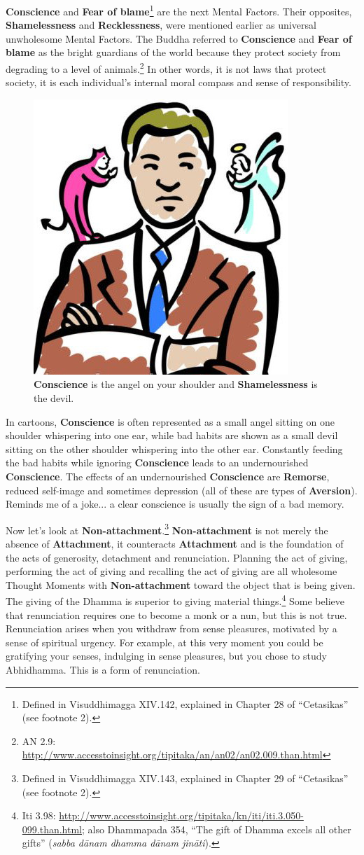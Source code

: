 \textbf{Conscience} and \textbf{Fear of blame}\footnote{Defined in Visuddhimagga XIV.142, explained in Chapter 28 of “Cetasikas” (see footnote 2).} are the next Mental Factors. Their opposites, \textbf{Shamelessness} and \textbf{Recklessness}, were mentioned earlier as universal unwholesome Mental Factors. The Buddha referred to \textbf{Conscience} and \textbf{Fear of blame} as the bright guardians of the world because they protect society from degrading to a level of animals.\footnote{AN 2.9: \url{http://www.accesstoinsight.org/tipitaka/an/an02/an02.009.than.html}} In other words, it is not laws that protect society, it is each individual’s internal moral compass and sense of responsibility.

\begin{figure}[h]
\centering
\includegraphics[width=0.17\linewidth]{./Diagrams/AngelDevil}
\caption{\textbf{Conscience} is the angel on your shoulder and \textbf{Shamelessness} is the devil.}
\label{fig:AngelDevil}
\end{figure}

In cartoons, \textbf{Conscience} is often represented as a small angel sitting on one shoulder whispering into one ear, while bad habits are shown as a small devil sitting on the other shoulder whispering into the other ear. Constantly feeding the bad habits while ignoring \textbf{Conscience} leads to an undernourished \textbf{Conscience}. The effects of an undernourished \textbf{Conscience} are \textbf{Remorse}, reduced self-image and sometimes depression (all of these are types of \textbf{Aversion}). Reminds me of a joke... a clear conscience is usually the sign of a bad memory.

Now let’s look at \textbf{Non-attachment}.\footnote{Defined in Visuddhimagga XIV.143, explained in Chapter 29 of “Cetasikas” (see footnote 2).} \textbf{Non-attachment} is not merely the absence of \textbf{Attachment}, it counteracts \textbf{Attachment} and is the foundation of the acts of generosity, detachment and renunciation. Planning the act of giving, performing the act of giving and recalling the act of giving are all wholesome Thought Moments with \textbf{Non-attachment} toward the object that is being given. The giving of the Dhamma is superior to giving material things.\footnote{Iti 3.98: \url{http://www.accesstoinsight.org/tipitaka/kn/iti/iti.3.050-099.than.html}; also Dhammapada 354, “The gift of Dhamma excels all other gifts” (\textit{sabba dānam dhamma dānam jināti}).} Some believe that renunciation requires one to become a monk or a nun, but this is not true. Renunciation arises when you withdraw from sense pleasures, motivated by a sense of spiritual urgency. For example, at this very moment you could be gratifying your senses, indulging in sense pleasures, but you chose to study Abhidhamma. This is a form of renunciation.

